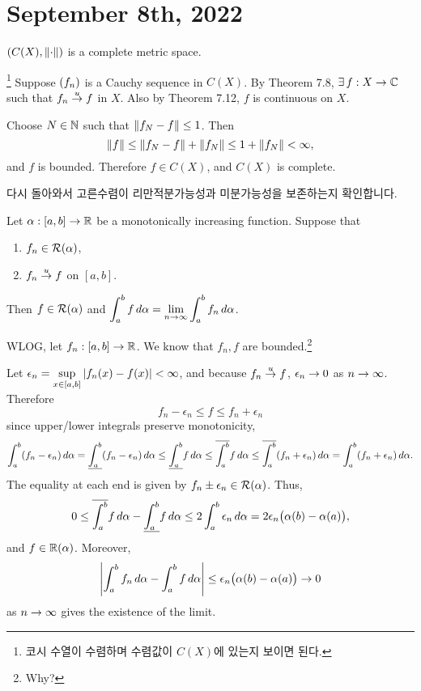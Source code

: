 \section*{September 8th, 2022}

 \((C(X), \left\lVert \cdot \right\rVert)\) is a complete metric space.

\pf \footnote{코시 수열이 수렴하며 수렴값이 \(C(X)\)에 있는지 보이면 된다.} Suppose \(\left( f_n \right)\) is a Cauchy sequence in \(C(X)\). By Theorem 7.8, \(\exists f: X\ra \C\) such that \(f_n \overset{u}{\rightarrow} f\) in \(X\). Also by Theorem 7.12, \(f\) is continuous on \(X\).

Choose \(N\in \mathbb{N}\) such that \(\left\lVert f_N - f \right\rVert \leq 1\). Then
\[
    \left\lVert f \right\rVert \leq \left\lVert f_N - f \right\rVert + \left\lVert f_N \right\rVert \leq 1 + \left\lVert f_N \right\rVert < \infty,
\]
and \(f\) is bounded. Therefore \(f \in C(X)\), and \(C(X)\) is complete.

\medskip

다시 돌아와서 고른수렴이 리만적분가능성과 미분가능성을 보존하는지 확인합니다.

 Let \(\alpha: [a, b] \rightarrow \mathbb{R}\) be a monotonically increasing function. Suppose that
\begin{enumerate}
    \item \(f_n \in \mathcal{R}(\alpha)\),
    \item \(f_n \overset{u}{\rightarrow} f\) on \([a, b]\).
\end{enumerate}
Then \(f \in \mathcal{R}(\alpha)\) and \(\displaystyle \int_a^b f \,d{\alpha} = \lim_{n \rightarrow \infty} \int_a^b f_n \,d{\alpha}\).

\pf WLOG, let \(f_n: [a, b] \rightarrow \mathbb{R}\). We know that \(f_n, f\) are bounded.\footnote{Why?}

Let \(\epsilon_n = \displaystyle \sup_{x \in [a, b]} \left| f_n(x) - f(x) \right| < \infty\), and because \(f_n \overset{u}{\rightarrow} f\), \(\epsilon_n \rightarrow 0\) as \(n \rightarrow \infty\). Therefore
\[
    f_n - \epsilon_n \leq f \leq f_n + \epsilon_n
\]
since upper/lower integrals preserve monotonicity,
\[
    \int_a^b (f_n - \epsilon_n) \,d{\alpha} = \underline{\int_{a}^{b}} (f_n - \epsilon_n) \,d{\alpha} \leq \underline{\int_{a}^{b}} f \,d{\alpha} \leq \overline{\int_{a}^{b}} f \,d{\alpha} \leq \overline{\int_{a}^{b}} (f_n + \epsilon_n) \,d{\alpha} = \int_a^b (f_n + \epsilon_n) \,d{\alpha}.
\]
The equality at each end is given by \(f_n \pm \epsilon_n \in \mathcal{R}(\alpha)\). Thus,
\[
    0 \leq \overline{\int_{a}^{b}} f \,d{\alpha} - \underline{\int_{a}^{b}} f \,d{\alpha} \leq 2 \int_a^b \epsilon_n \,d{\alpha} = 2\epsilon_n \big(\alpha(b) - \alpha(a)\big),
\]
and \(f \in \mathcal{\mathbb{R}}(\alpha)\). Moreover,
\[
    \left| \int_a^b f_n \,d{\alpha} - \int_a^b f \,d{\alpha} \right| \leq \epsilon_n \big(\alpha(b) - \alpha(a)\big) \rightarrow 0
\]
as \(n \rightarrow \infty\) gives the existence of the limit.

